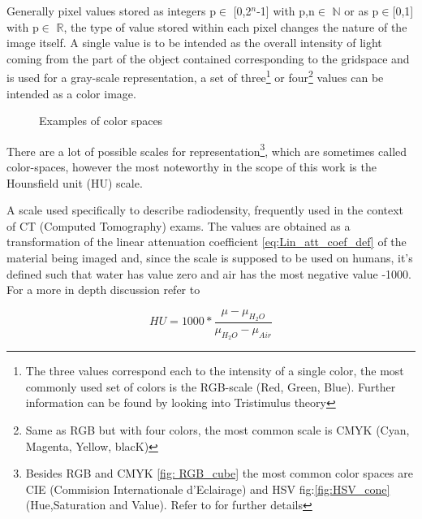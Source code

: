 Generally pixel values stored as integers p$\in$ [0,2$^{n}$-1] with p,n$\in$ $\mathbb{N}$  or as p$\in$[0,1] with p$\in$ $\mathbb{R}$, the type of value stored within each pixel changes the nature of the image itself.
A single value is to be intended as the overall intensity of light coming from the part of the object contained corresponding to the gridspace and is used for a gray-scale representation, a set of three\footnote{The three values correspond each to the intensity of a single color, the most commonly used set of colors is the RGB-scale (Red, Green, Blue). Further information can be found by looking into Tristimulus theory\cite{Tristimulus}}  or four\footnote{Same as RGB but with four colors, the most common scale is CMYK (Cyan, Magenta, Yellow, blacK)} values can be intended as a color image.

\begin{figure}[H]
     \centering
    \qquad
     \caption{Examples of color spaces}
     \label{fig:color_spaces}
\end{figure}

There are a lot of possible scales for representation\footnote{Besides RGB and CMYK \ref{fig: RGB_cube} the most common color spaces are CIE (Commision Internationale d’Eclairage) and HSV fig:\ref{fig:HSV_cone} (Hue,Saturation and Value). Refer to \cite{Color_spaces} for further details}, which are sometimes called color-spaces, however the most noteworthy in the scope of this work is the Hounsfield unit (HU) scale.

\begin{definition}
A scale used specifically to describe radiodensity, frequently used in the context of CT (Computed Tomography) exams. The values are obtained as a transformation of the linear attenuation coefficient \ref{eq:Lin_att_coef_def} of the material being imaged and, since the scale is supposed to be used on humans, it's defined such that water has value zero and air has the most negative value -1000. For  a more in depth discussion refer to \cite{Hounsfield}
\end{definition}

\begin{equation}\label{eq:HU_def}
    HU = 1000*\frac{\mu - \mu_{H_2O}}{\mu_{H_2O} - \mu_{Air}}
\end{equation}

